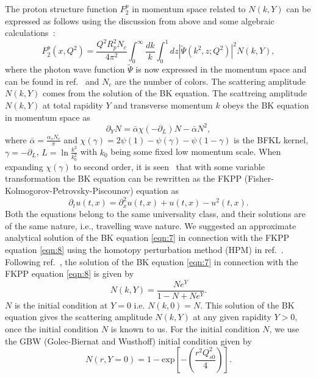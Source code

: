 \documentclass[12pt]{article}
\begin{document}
The proton structure function $F_2 ^p$ in momentum space related to $N(k,Y)$ can be expressed as follows using the discussion from above and some algebraic calculations~\cite{ac}: 
\begin{equation}\label{eqn:6}
	F_2 ^p (x, Q^2) = \frac{Q^2 R_p ^2 N_c}{4\pi^2} \int_{0}^{\infty}\frac{dk}{k}\int_{0}^{1} dz |\tilde{\Psi} (k^2 , z; Q^2)|^2 N(k,Y) ,
\end{equation}
where the photon wave function $\tilde{\Psi}$ is now expressed in the momentum space and can be found in ref.~\cite{ac} and $N_c$ are the number of colors. The scattering amplitude $N(k, Y)$ comes from the solution of the BK equation. The scattreing amplitude $N(k,Y)$ at total rapidity $Y$ and transverse momentum $k$ obeys the BK equation in momentum space as~\cite{p}
\begin{equation}\label{eqn:7}
	\partial_Y N = \bar{{\alpha}}\chi(-\partial_L)N - \bar{{\alpha}}N^2 ,
\end{equation}
where $\bar{{\alpha}} = \frac{\alpha_s N_c}{\pi}$ and $\chi (\gamma) = 2\psi(1)-\psi(\gamma)-\psi(1-\gamma)$ is the BFKL kernel, $\gamma = -\partial_L$, $L=\ln\frac{k^2}{k_0 ^2}$ with $k_0$ being some fixed low momentum scale. When expanding $\chi (\gamma)$ to second order, it is seen~\cite{11,12,13} that with some variable transformation the BK equation can be rewritten as the FKPP (Fisher-Kolmogorov-Petrovsky-Piscounov) equation as~\cite{aj,ak}
\begin{equation}\label{eqn:8}
	\partial_t u(t,x) = \partial_x ^2 u(t,x) + u(t,x) -u^2 (t,x) .
\end{equation}
Both the equations belong to the same universality class, and their solutions are of the same nature, i.e., travelling wave nature. We suggested an approximate analytical solution of the BK equation \eqref{eqn:7} in connection with the FKPP equation \eqref{eqn:8} using the homotopy perturbation method (HPM) in ref.~\cite{v}. Following ref.~\cite{v}, the solution of the BK equation \eqref{eqn:7} in connection with the FKPP equation \eqref{eqn:8} is given by
\begin{equation}\label{a}
	N(k,Y) = \frac{Ne^Y}{1-N+Ne^Y}.
\end{equation}
$N$ is the initial condition at $Y=0$ i.e. $N(k,0)=N$. This solution of the BK equation gives the scattering amplitude $N(k,Y)$ at any given rapidity $Y>0$, once the initial condition $N$ is known to us. For the initial condition $N$, we use the GBW (Golec-Biernat and Wusthoff) initial condition given by~\cite{14}
\begin{equation}\label{b}
	N (r,Y=0)=1-\text{exp}\left[-\left(\frac{r^2 Q_{s0} ^2}{4}\right)\right].
\end{equation}
\end{document}
